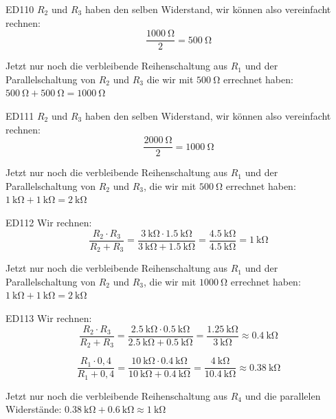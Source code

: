 \begin{sol}{ED110}
$R_2$ und $R_3$ haben den selben Widerstand, wir können also vereinfacht rechnen:
 $$ \frac{\SI{1000}{\ohm}}{2} = \SI{500}{\ohm} $$ 

 Jetzt nur noch die verbleibende Reihenschaltung aus $R_1$ und der Parallelschaltung von $R_2$ und $R_3$ die wir mit $\SI{500}{\ohm}$ errechnet haben:
 $\SI{500}{\ohm}+ \SI{500}{\ohm} = \SI{1000}{\ohm} $
\end{sol}


\begin{sol}{ED111}
$R_2$ und $R_3$ haben den selben Widerstand, wir können also vereinfacht rechnen:
 $$ \frac{\SI{2000}{\ohm}}{2} = \SI{1000}{\ohm} $$ 

 Jetzt nur noch die verbleibende Reihenschaltung aus $R_1$ und der Parallelschaltung von $R_2$ und $R_3$, die wir mit $\SI{500}{\ohm}$ errechnet haben:
 $\SI{1}{\kilo\ohm}+ \SI{1}{\kilo\ohm} = \SI{2}{\kilo\ohm} $
\end{sol}



\begin{sol}{ED112}
Wir rechnen:
 $$
 \frac{R_2\cdot R_3}{R_2 + R_3} 
 = \frac{\SI{3}{\kilo\ohm}\cdot \SI{1,5}{\kilo\ohm}}{\SI{3}{\kilo\ohm} + \SI{1,5}{\kilo\ohm}} = \frac{\SI{4,5}{\kilo\ohm}}{\SI{4,5}{\kilo\ohm}} = \SI{1}{\kilo\ohm}$$
 
 Jetzt nur noch die verbleibende Reihenschaltung aus $R_1$ und der Parallelschaltung von $R_2$ und $R_3$, die wir mit $\SI{1000}{\ohm}$ errechnet haben:
 $\SI{1}{\kilo\ohm}+ \SI{1}{\kilo\ohm} = \SI{2}{\kilo\ohm} $
\end{sol}


\begin{sol}{ED113}
Wir rechnen:
 $$
 \frac{R_2\cdot R_3}{R_2 + R_3} 
 = \frac{\SI{2,5}{\kilo\ohm}\cdot \SI{0,5}{\kilo\ohm}}{\SI{2,5}{\kilo\ohm} + \SI{0,5}{\kilo\ohm}} = \frac{\SI{1,25}{\kilo\ohm}}{\SI{3}{\kilo\ohm}} \approx \SI{0,4}{\kilo\ohm}$$
 

 $$
 \frac{R_1\cdot 0,4}{R_1 + 0,4} 
 = \frac{\SI{10}{\kilo\ohm}\cdot \SI{0,4}{\kilo\ohm}}{\SI{10}{\kilo\ohm} + \SI{0,4}{\kilo\ohm}} = \frac{\SI{4}{\kilo\ohm}}{\SI{10,4}{\kilo\ohm}} \approx \SI{0,38}{\kilo\ohm}$$

 Jetzt nur noch die verbleibende Reihenschaltung aus $R_4$ und die parallelen Widerstände:
 $\SI{0,38}{\kilo\ohm}+ \SI{0,6}{\kilo\ohm} \approx \SI{1}{\kilo\ohm} $
\end{sol}



